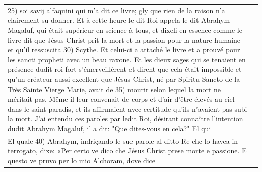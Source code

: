 \begin{longtable}{p{}p{}}
25) soi savij alfaquini qui m'a dit ce livre; gly que rien de la raison n'a clairement su donner. Et à cette heure le dit Roi appela le dit Abrahym Magaluf, qui était supérieur en science à tous, et dixeli en essence comme le livre dit que Jésus Christ prit la mort et la passion pour la nature humaine et qu'il ressuscita
30) Scythe. Et celui-ci a attaché le livre et a prouvé pour les sancti propheti avec un beau raxone. Et les dieux sages qui se tenaient en présence dudit roi fort s'émerveillèrent et dirent que cela était impossible et qu'un créateur aussi excellent que Jésus Christ, né par Spiritu Sancto de la Très Sainte Vierge Marie, avait de
35) mourir selon lequel la mort ne méritait pas. Même il leur convenait de corps et d'air d'être élevés au ciel dans le saint paradis, et ils affirmaient avec certitude qu'ils n'avaient pas subi la mort. J'ai entendu ces paroles par ledit Roi, désirant connaître l'intention dudit Abrahym Magaluf, il a dit: "Que dites-vous en cela?" El qui
         \\
    El quale
40) Abrahym, indriçando le sue parole al ditto Re chc lo havea in  terrogato, dixe: «Per certo ve dico che Jésus Christ prese morte e passione. E questo ve pruvo per lo mio Alchoram, dove dice
  

\end{longtable}
